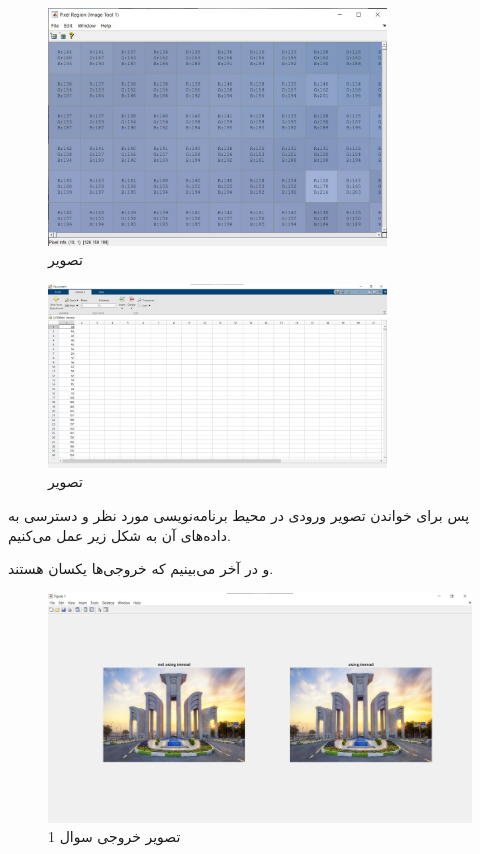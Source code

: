 \documentclass{article}
\begin{document}
\begin{figure}[H]
    \centering
    \includegraphics[width=0.8\textwidth]{figures/1b.jpg}
    \caption
	{
تصویر
	}
    \label{fig:fig1}
\end{figure}
\begin{figure}[H]
    \centering
    \includegraphics[width=0.8\textwidth]{figures/1c.jpg}
    \caption
	{
تصویر
	}
    \label{fig:fig1}
\end{figure}
پس برای خواندن تصویر ورودی در محیط برنامه‌نویسی مورد نظر و دسترسی به داده‌های آن به شکل زیر عمل می‌کنیم.
\begin{latin}

\end{latin}
و در آخر می‌بینیم که خروجی‌ها یکسان هستند.
\begin{figure}[H]
    \centering
    \includegraphics[width=1\textwidth]{figures/1d.jpg}
    \caption
	{
تصویر خروجی سوال 1
	}
    \label{fig:fig1}
\end{figure}
\end{document}
